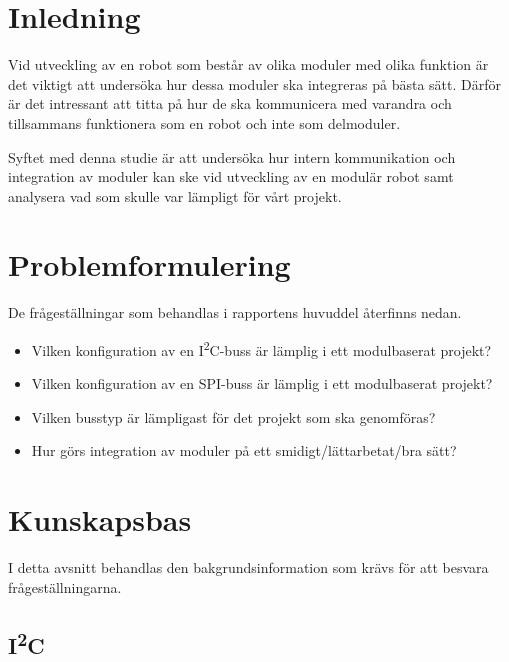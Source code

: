 \documentclass[11pt]{article}
\begin{document}
\begin{flushleft}

\section{Inledning}
Vid utveckling av en robot som består av olika moduler med olika funktion är det viktigt att undersöka hur dessa moduler ska integreras på bästa sätt. Därför är det intressant att titta på hur de ska kommunicera med varandra och tillsammans funktionera som en robot och inte som delmoduler. 


Syftet med denna studie är att undersöka hur intern kommunikation och integration av moduler kan ske vid utveckling av en modulär robot samt analysera vad som skulle var lämpligt för vårt projekt. 


\section{Problemformulering}
De frågeställningar som behandlas i rapportens huvuddel återfinns nedan.

\begin{itemize}
	\item Vilken konfiguration av en I\textsuperscript{2}C-buss är lämplig i ett modulbaserat projekt?
	\item Vilken konfiguration av en SPI-buss är lämplig i ett modulbaserat projekt?
	\item Vilken busstyp är lämpligast för det projekt som ska genomföras?
	\item Hur görs integration av moduler på ett smidigt/lättarbetat/bra sätt?
\end{itemize}

\pagebreak

\section{Kunskapsbas}
I detta avsnitt behandlas den bakgrundsinformation som krävs för att besvara frågeställningarna.

\subsection{I\textsuperscript{2}C}


\end{flushleft}
\end{document}
